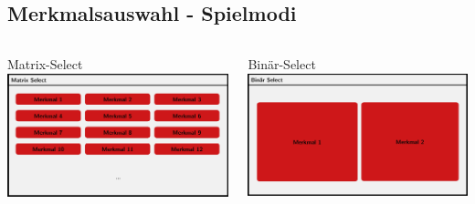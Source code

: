 \documentclass[xcolor=dvipsnames]{beamer}
\begin{document}
\subsection{Merkmalsauswahl - Spielmodi}
\begin{frame}
    \begin{columns}
        \begin{column}{0.5\textwidth}
            \begin{block}{Matrix-Select}
                \includegraphics[width=\textwidth]{img/MatrixSelect_ausschnitt.jpg}
            \end{block}
        \end{column}
        \begin{column}{0.5\textwidth}  %
            \begin{block}{Binär-Select}
                \includegraphics[width=\textwidth]{img/BinSelect_ausschnitt.jpg}
            \end{block}
        \end{column}
    \end{columns}
\end{frame}
\end{document}
